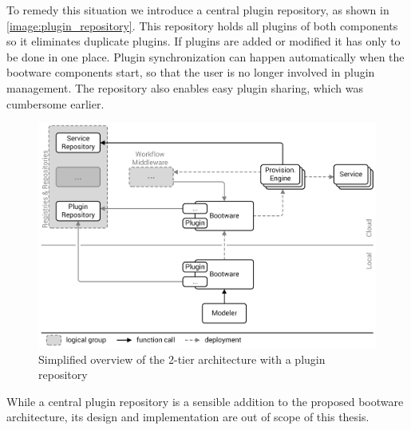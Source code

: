 To remedy this situation we introduce a central plugin repository, as shown in \autoref{image:plugin_repository}.
This repository holds all plugins of both components so it eliminates duplicate plugins.
If plugins are added or modified it has only to be done in one place.
Plugin synchronization can happen automatically when the bootware components start, so that the user is no longer involved in plugin management.
The repository also enables easy plugin sharing, which was cumbersome earlier.

\begin{figure}[!htbp]
	\centering
	\includegraphics[resolution=600]{design/assets/simple_plugin_repository}
	\caption{Simplified overview of the 2-tier architecture with a plugin repository}
	\label{image:plugin_repository}
\end{figure}

While a central plugin repository is a sensible addition to the proposed bootware architecture, its design and implementation are out of scope of this thesis.

